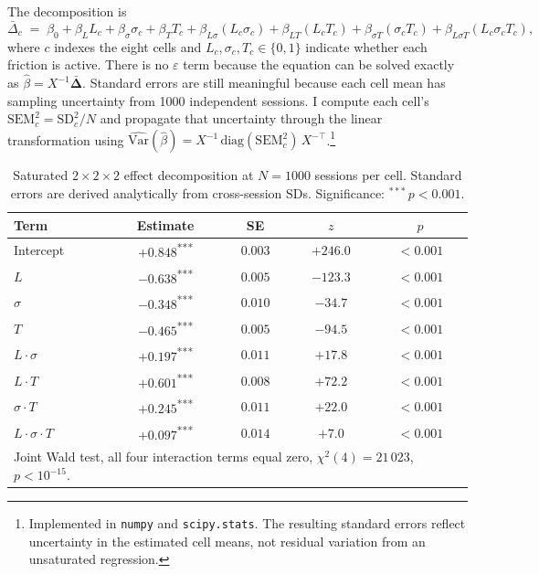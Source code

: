 The decomposition is
\begin{equation*}
\bar{\Delta}_c \;=\; \beta_0 + \beta_L L_c + \beta_\sigma \sigma_c + \beta_T T_c + \beta_{L\sigma}(L_c\sigma_c) + \beta_{LT}(L_cT_c) + \beta_{\sigma T}(\sigma_cT_c) + \beta_{L\sigma T}(L_c\sigma_cT_c),
\end{equation*}
where $c$ indexes the eight cells and $L_c,\sigma_c,T_c\in\{0,1\}$ indicate whether each friction is active. There is no $\varepsilon$ term because the equation can be solved exactly as $\hat\beta = X^{-1}\bar{\boldsymbol\Delta}$. Standard errors are still meaningful because each cell mean has sampling uncertainty from 1000 independent sessions. I compute each cell's $\mathrm{SEM}_c^2 = \mathrm{SD}_c^2 / N$ and propagate that uncertainty through the linear transformation using $\widehat{\mathrm{Var}}(\hat\beta) = X^{-1}\,\mathrm{diag}(\mathrm{SEM}_c^2)\,X^{-\top}$.\footnote{Implemented in \texttt{numpy} and \texttt{scipy.stats}. The resulting standard errors reflect uncertainty in the estimated cell means, not residual variation from an unsaturated regression.}

\begin{table}[H]
\centering
\caption{Saturated $2\times 2\times 2$ effect decomposition at $N=1000$ sessions per cell. Standard errors are derived analytically from cross-session SDs. Significance: $^{***}\,p<0.001$.}
\label{tab:factorial-regression}
\renewcommand{\arraystretch}{1.05}
\begin{tabular}{lcccc}
\toprule
Term & Estimate & SE & $z$ & $p$ \\
\midrule
Intercept                & $+0.848$\textsuperscript{***} & $0.003$ & $+246.0$ & $<\!0.001$ \\
$L$                      & $-0.638$\textsuperscript{***} & $0.005$ & $-123.3$ & $<\!0.001$ \\
$\sigma$                 & $-0.348$\textsuperscript{***} & $0.010$ & $-34.7$  & $<\!0.001$ \\
$T$                      & $-0.465$\textsuperscript{***} & $0.005$ & $-94.5$  & $<\!0.001$ \\
$L\cdot\sigma$           & $+0.197$\textsuperscript{***} & $0.011$ & $+17.8$  & $<\!0.001$ \\
$L\cdot T$               & $+0.601$\textsuperscript{***} & $0.008$ & $+72.2$  & $<\!0.001$ \\
$\sigma\cdot T$          & $+0.245$\textsuperscript{***} & $0.011$ & $+22.0$  & $<\!0.001$ \\
$L\cdot\sigma\cdot T$    & $+0.097$\textsuperscript{***} & $0.014$ & $+7.0$   & $<\!0.001$ \\
\midrule
\multicolumn{5}{l}{Joint Wald test, all four interaction terms equal zero, $\chi^2(4) = 21\,023$, $p<10^{-15}$.} \\
\bottomrule
\end{tabular}
\end{table}

